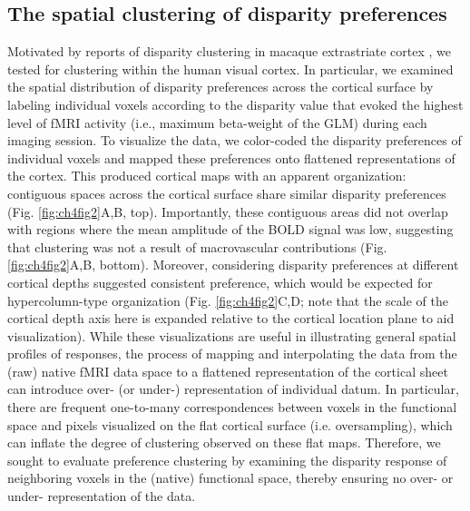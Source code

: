 \subsection{The spatial clustering of disparity preferences}
Motivated by reports of disparity clustering in macaque extrastriate cortex \cite{Anzai:2011gb,Yeagle_Lafer-Sousa_Conway_2013}, we tested for clustering within the human visual cortex. In particular, we examined the spatial distribution of disparity preferences across the cortical surface by labeling individual voxels according to the disparity value that evoked the highest level of fMRI activity (i.e., maximum beta-weight of the GLM) during each imaging session. To visualize the data, we color-coded the disparity preferences of individual voxels and mapped these preferences onto flattened representations of the cortex. This produced cortical maps with an apparent organization: contiguous spaces across the cortical surface share similar disparity preferences (Fig. \ref{fig:ch4fig2}A,B, top). Importantly, these contiguous areas did not overlap with regions where the mean amplitude of the BOLD signal was low, suggesting that clustering was not a result of macrovascular contributions (Fig. \ref{fig:ch4fig2}A,B, bottom). Moreover, considering disparity preferences at different cortical depths suggested consistent preference, which would be expected for hypercolumn-type organization (Fig. \ref{fig:ch4fig2}C,D; note that the scale of the cortical depth axis here is expanded relative to the cortical location plane to aid visualization).
While these visualizations are useful in illustrating general spatial profiles of responses, the process of mapping and interpolating the data from the (raw) native fMRI data space to a flattened representation of the cortical sheet can introduce over- (or under-) representation of individual datum. In particular, there are frequent one-to-many correspondences between voxels in the functional space and pixels visualized on the flat cortical surface (i.e. oversampling), which can inflate the degree of clustering observed on these flat maps. Therefore, we sought to evaluate preference clustering by examining the disparity response of neighboring voxels in the (native) functional space, thereby ensuring no over- or under- representation of the data. 

